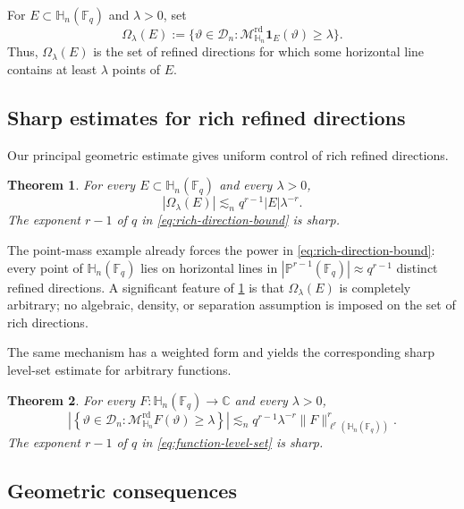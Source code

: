 \documentclass[11pt,letterpaper]{amsart}
\numberwithin{equation}{section}
\newtheorem{theorem}{Theorem}[section]
\theoremstyle{definition}
\theoremstyle{remark}
\newcommand{\Fq}{\mathbb F_q}
\newcommand{\C}{\mathbb C}
\newcommand{\PP}{\mathbb P}
\newcommand{\HH}{\mathbb H}
\newcommand{\Dn}{\mathcal D_n}
\newcommand{\Mrd}{\mathcal M^{\mathrm{rd}}_{\HH_n}}
\newcommand{\one}{\mathbf 1}
\newcommand{\norm}[1]{\lVert #1\rVert}
\begin{document}
For $E\subset\HH_n(\Fq)$ and $\lambda>0$, set
\[
 \Omega_\lambda(E)
 :=
 \bigl\{
   \vartheta\in\Dn:
   \Mrd\one_E(\vartheta)\geq\lambda
 \bigr\}.
\]
Thus, $\Omega_\lambda(E)$ is the set of refined directions for which
some horizontal line contains at least $\lambda$ points of $E$.




\subsection{Sharp estimates for rich refined directions}

Our principal geometric estimate gives uniform control of rich refined directions.
\begin{theorem}
\label{thm:rich-direction-estimate}
For every $E\subset\HH_n(\Fq)$ and every $\lambda>0$,
\begin{equation}\label{eq:rich-direction-bound}
 |\Omega_\lambda(E)|
 \lesssim_n
 q^{r-1}|E|\lambda^{-r}.
\end{equation}
The exponent $r-1$ of $q$ in
\eqref{eq:rich-direction-bound} is sharp.
\end{theorem}
The point-mass example already forces the power in
\eqref{eq:rich-direction-bound}: every point of $\HH_n(\Fq)$ lies on
horizontal lines in
$|\PP^{r-1}(\Fq)|\approx q^{r-1}$ distinct refined directions.
A significant feature of \cref{thm:rich-direction-estimate} is that
$\Omega_\lambda(E)$ is completely arbitrary; no algebraic, density, or
separation assumption is imposed on the set of rich directions.

The same mechanism has a weighted form and yields the corresponding sharp level-set estimate for arbitrary functions.

\begin{theorem}
\label{thm:function-level-set}
For every $F:\HH_n(\Fq)\to\C$ and every $\lambda>0$,
\begin{equation}\label{eq:function-level-set}
 \left|
 \left\{
   \vartheta\in\Dn:
   \Mrd F(\vartheta)\geq\lambda
 \right\}
 \right|
 \lesssim_n
 q^{r-1}\lambda^{-r}
 \norm{F}_{\ell^r(\HH_n(\Fq))}^r.
\end{equation}
The exponent $r-1$ of $q$ in
\eqref{eq:function-level-set} is sharp.
\end{theorem}





\subsection{Geometric consequences}
\end{document}
